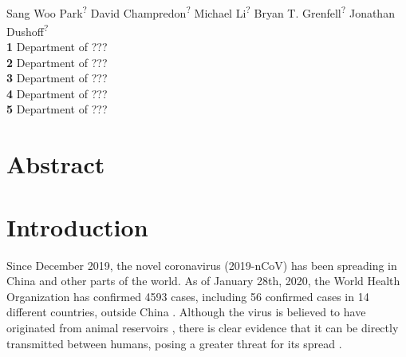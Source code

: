 \documentclass[12pt]{article}
\date{\today}
\begin{document}
\begin{flushleft}{
	\Large
	\textbf{}
}
\newline
\\
Sang Woo Park\textsuperscript{?}
David Champredon\textsuperscript{?}
Michael Li\textsuperscript{?}
Bryan T. Grenfell\textsuperscript{?}
Jonathan Dushoff\textsuperscript{?}
\\
\bigskip
\textbf{1} Department of ???
\\
\textbf{2} Department of ???
\\
\textbf{3} Department of ???
\\
\textbf{4} Department of ???
\\
\textbf{5} Department of ???
\\
\bigskip

\end{flushleft}

\section*{Abstract}

\pagebreak

\section{Introduction}

Since December 2019, the novel coronavirus (2019-nCoV) has been spreading in China and other parts of the world.
As of January 28th, 2020, the World Health Organization has confirmed 4593 cases, including 56 confirmed cases in 14 different countries, outside China \citep{who28report}.
Although the virus is believed to have originated from animal reservoirs \citep{cdcncov}, 
there is clear evidence that it can be directly transmitted between humans,
posing a greater threat for its spread \citep{huang2020clinical,who26report}.
\end{document}
